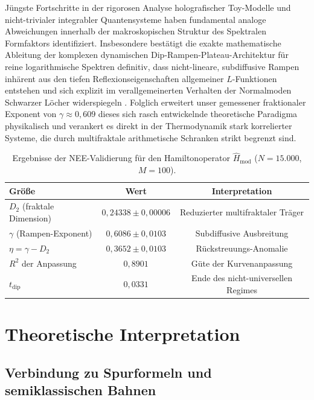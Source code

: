 \documentclass[aps,prl,preprint,superscriptaddress,floatfix]{revtex4-2}
\begin{document}
Jüngste Fortschritte in der rigorosen Analyse holografischer Toy-Modelle und nicht-trivialer integrabler Quantensysteme haben fundamental analoge Abweichungen innerhalb der makroskopischen Struktur des Spektralen Formfaktors identifiziert. Insbesondere bestätigt die exakte mathematische Ableitung der komplexen dynamischen Dip-Rampen-Plateau-Architektur für reine logarithmische Spektren definitiv, dass nicht-lineare, subdiffusive Rampen inhärent aus den tiefen Reflexionseigenschaften allgemeiner $L$-Funktionen entstehen und sich explizit im verallgemeinerten Verhalten der Normalmoden Schwarzer Löcher widerspiegeln \cite{Ageev2024, Ageev2026}. Folglich erweitert unser gemessener fraktionaler Exponent von $\gamma \approx 0,609$ dieses sich rasch entwickelnde theoretische Paradigma physikalisch und verankert es direkt in der Thermodynamik stark korrelierter Systeme, die durch multifraktale arithmetische Schranken strikt begrenzt sind.

\begin{table}[h]
\caption{\label{tab:resultados_finales} Ergebnisse der NEE-Validierung für den Hamiltonoperator $\hat{H}_{\text{mod}}$ ($N=15.000$, $M=100$).}
\begin{ruledtabular}
\begin{tabular}{lcc}
\textbf{Größe} & \textbf{Wert} & \textbf{Interpretation} \\
\hline
$D_2$ (fraktale Dimension) & $0,24338 \pm 0,00006$ & Reduzierter multifraktaler Träger \\
$\gamma$ (Rampen-Exponent) & $0,6086 \pm 0,0103$ & Subdiffusive Ausbreitung \\
$\eta = \gamma - D_2$ & $0,3652 \pm 0,0103$ & Rückstreuungs-Anomalie \\
$R^2$ der Anpassung & $0,8901$ & Güte der Kurvenanpassung \\
$t_{\text{dip}}$ & $0,0331$ & Ende des nicht-universellen Regimes \\
\end{tabular}
\end{ruledtabular}
\end{table}

\section{Theoretische Interpretation}

\subsection{Verbindung zu Spurformeln und semiklassischen Bahnen}
\end{document}
